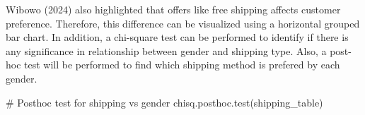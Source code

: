 \documentclass[
  letterpaper,
  DIV=11,
  numbers=noendperiod]{scrartcl}
\newenvironment{Shaded}{\begin{snugshade}}{\end{snugshade}}
\newcommand{\AttributeTok}[1]{\textcolor[rgb]{0.40,0.45,0.13}{#1}}
\newcommand{\CommentTok}[1]{\textcolor[rgb]{0.37,0.37,0.37}{#1}}
\newcommand{\FunctionTok}[1]{\textcolor[rgb]{0.28,0.35,0.67}{#1}}
\newcommand{\NormalTok}[1]{\textcolor[rgb]{0.00,0.23,0.31}{#1}}
\newcommand{\OtherTok}[1]{\textcolor[rgb]{0.00,0.23,0.31}{#1}}
\newcommand{\SpecialCharTok}[1]{\textcolor[rgb]{0.37,0.37,0.37}{#1}}
\newcommand{\StringTok}[1]{\textcolor[rgb]{0.13,0.47,0.30}{#1}}
\begin{document}
Wibowo (2024) also highlighted that offers like free shipping affects
customer preference. Therefore, this difference can be visualized using
a horizontal grouped bar chart. In addition, a chi-square test can be
performed to identify if there is any significance in relationship
between gender and shipping type. Also, a post-hoc test will be
performed to find which shipping method is prefered by each gender.

\begin{Shaded}
\end{Shaded}

\begin{Shaded}
\end{Shaded}

\begin{Shaded}
\begin{Highlighting}[]
\CommentTok{\# Posthoc test for shipping vs gender}
\FunctionTok{chisq.posthoc.test}\NormalTok{(shipping\_table)}
\end{Highlighting}
\end{Shaded}
\end{document}
